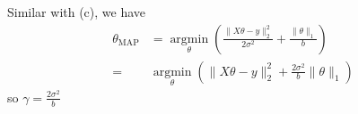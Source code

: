 \begin{answer}
Similar with (c), we have
\begin{align*}
\theta_{\text{MAP}} & = \operatorname*{argmin}_{\theta}\left( \frac{\|X\theta-y\|^2_{2}}{2\sigma^2}+\frac{\|\theta\|_{1}}{b}\right) \\
= &\operatorname*{argmin}_{\theta}\left( \|X\theta-y\|^2_{2}+\frac{2\sigma^2}{b}\|\theta\|_{1}\right)
\end{align*}
so $ \gamma = \frac{2\sigma^2}{b} $
\end{answer}
